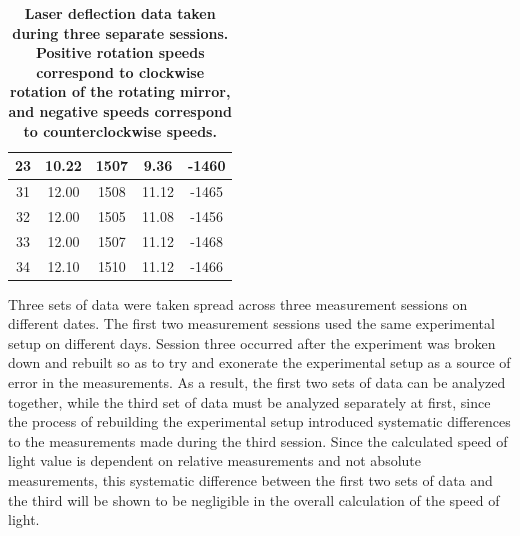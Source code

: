 \documentclass[twocolumn]{article}
\begin{document}
\begin{table}[]
\begin{tabular}{c c c c c}
				23       & 10.22                                                          & 1507                                                        & 9.36                                                            & -1460                                                        \\ \hline
				31       & 12.00                                                          & 1508                                                        & 11.12                                                           & -1465                                                        \\
				32       & 12.00                                                          & 1505                                                        & 11.08                                                           & -1456                                                        \\
				33       & 12.00                                                          & 1507                                                        & 11.12                                                           & -1468                                                        \\
				34       & 12.10                                                          & 1510                                                        & 11.12                                                           & -1466  \\ \hline                                                     
			\end{tabular}
			\caption{\textbf{Laser deflection data taken during three separate sessions. Positive rotation speeds correspond to clockwise rotation of the rotating mirror, and negative speeds correspond to counterclockwise speeds.}}
			\label{tab:rawmeasure}
		\end{table}
		
		
		
	Three sets of data were taken spread across three measurement sessions on different dates. 
	The first two measurement sessions used the same experimental setup on different days. 
	Session three occurred after the experiment was broken down and rebuilt so as to try and exonerate the experimental setup as a source of error in the measurements. 
	As a result, the first two sets of data can be analyzed together, while the third set of data must be analyzed separately at first, since the process of rebuilding the experimental setup introduced systematic differences to the measurements made during the third session. 
	Since the calculated speed of light value is dependent on relative measurements and not absolute measurements, this systematic difference between the first two sets of data and the third will be shown to be negligible in the overall calculation of the speed of light.
	
\end{document}
